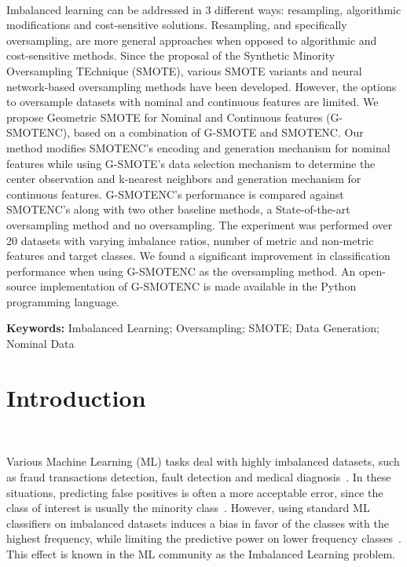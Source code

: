 ~\label{chp:gsmotenc}
\graphicspath{{figures/gsmotenc/}}

\begin{adjustwidth}{30pt}{30pt}

    Imbalanced learning can be addressed in 3 different ways: resampling,
    algorithmic modifications and cost-sensitive solutions. Resampling, and
    specifically oversampling, are more general approaches when opposed to
    algorithmic and cost-sensitive methods. Since the proposal of the
    Synthetic Minority Oversampling TEchnique (SMOTE), various SMOTE variants
    and neural network-based oversampling methods have been developed.
    However, the options to oversample datasets with nominal and continuous
    features are limited. We propose Geometric SMOTE for Nominal and
    Continuous features (G-SMOTENC), based on a combination of G-SMOTE and
    SMOTENC. Our method modifies SMOTENC's encoding and generation mechanism
    for nominal features while using G-SMOTE's data selection mechanism to
    determine the center observation and k-nearest neighbors and generation
    mechanism for continuous features. G-SMOTENC's performance is compared
    against SMOTENC's along with two other baseline methods, a
    State-of-the-art oversampling method and no oversampling. The experiment
    was performed over 20 datasets with varying imbalance ratios, number of
    metric and non-metric features and target classes. We found a significant
    improvement in classification performance when using G-SMOTENC as
    the oversampling method. An open-source implementation of G-SMOTENC is
    made available in the Python programming language.

\end{adjustwidth}

\vspace{.5cm}
\textbf{Keywords:} Imbalanced Learning; Oversampling; SMOTE; Data Generation;
Nominal Data

\section{Introduction}~\label{sec:introduction-gsmotenc}

Various Machine Learning (ML) tasks deal with highly imbalanced datasets, such
as fraud transactions detection, fault detection and medical
diagnosis~\cite{tyagi2020sampling}. In these situations, predicting false
positives is often a more acceptable error, since the class of interest is
usually the minority class~\cite{vuttipittayamongkol2021class}. However, using
standard ML classifiers on imbalanced datasets induces a bias in favor of the
classes with the highest frequency, while limiting the predictive power on
lower frequency classes~\cite{lopez2013insight, das2018handling}. This effect
is known in the ML community as the Imbalanced Learning problem.

